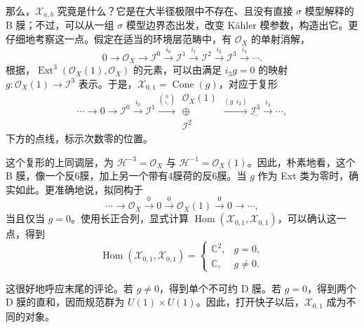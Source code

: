 那么，$\mathcal{X}_{a,b}$ 究竟是什么？它是在大半径极限中不存在、且没有直接 $\sigma$ 模型解释的 B 膜；不过，可以从一组 $\sigma$ 模型边界态出发，改变 K\"ahler 模参数，构造出它。更仔细地考察这一点。假定在适当的环境层范畴中，有 $\mathcal{O}_X$ 的单射消解，
\begin{equation}\label{eq:5.150}
0\longrightarrow\mathcal{O}_X\longrightarrow\mathcal{I}^0
\xrightarrow{i_0}\mathcal{I}^1\xrightarrow{i_1}\mathcal{I}^2
\xrightarrow{i_2}\mathcal{I}^3\xrightarrow{i_3}\cdots.
\end{equation}
根据，$\operatorname{Ext}^3(\mathcal{O}_X(1),\mathcal{O}_X)$ 的元素，可以由满足 $i_3g=0$ 的映射 $g\colon\mathcal{O}_X(1)\to\mathcal{I}^3$ 表示。于是，$\mathcal{X}_{0,1}=\operatorname{Cone}(g)$，对应于复形
\begin{equation}\label{eq:5.151}
\cdots\to0\to\mathcal{I}^0\xrightarrow{i_0}\mathcal{I}^1
\xrightarrow{\binom{0}{i_1}}
\begin{matrix}\mathcal{O}_X(1)\\\oplus\\\mathcal{I}^2\end{matrix}
\xrightarrow{(g\ \ i_2)}\underset{\scriptscriptstyle\cdots}{\mathcal{I}^3}
\xrightarrow{i_3}\cdots,
\end{equation}
下方的点线，标示次数零的位置。

这个复形的上同调层，为 $\mathcal{H}^{-3}=\mathcal{O}_X$ 与 $\mathcal{H}^{-1}=\mathcal{O}_X(1)$。因此，朴素地看，这个 B 膜，像一个反6膜，加上另一个带有4膜荷的反6膜。当 $g$ 作为 Ext 类为零时，确实如此。更准确地说，拟同构于
\begin{equation}\label{eq:5.152}
\cdots\longrightarrow\mathcal{O}_X\xrightarrow{0}0
\xrightarrow{0}\mathcal{O}_X(1)\xrightarrow{0}0\longrightarrow\cdots,
\end{equation}
当且仅当 $g=0$。使用长正合列，显式计算 $\operatorname{Hom}(\mathcal{X}_{0,1},\mathcal{X}_{0,1})$，可以确认这一点，得到
\begin{equation}\label{eq:5.153}
\operatorname{Hom}(\mathcal{X}_{0,1},\mathcal{X}_{0,1})
=\begin{cases}
\mathbb{C}^2,&g=0,\\
\mathbb{C},&g\ne0.
\end{cases}
\end{equation}

这很好地呼应末尾的评论。若 $g\ne0$，得到单个不可约 D 膜。若 $g=0$，得到两个 D 膜的直和，因而规范群为 $U(1)\times U(1)$。因此，打开快子以后，$\mathcal{X}_{0,1}$ 成为不同的对象。


